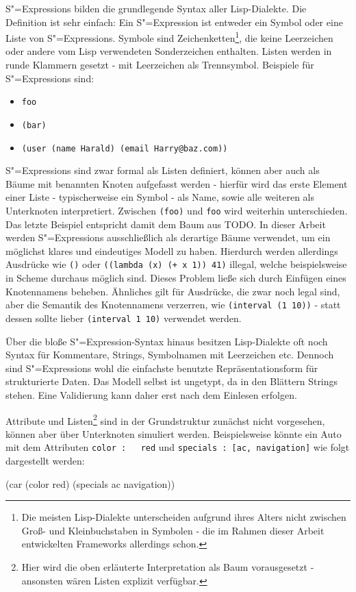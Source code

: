 \documentclass[a4paper, bibgerm]{book}
\newcommand\icode[1]{\lstinline?#1?}
\newcommand\abb{}
\newcommand{\sexp}{S"=Expression}
\newcommand{\sexps}{S"=Expressions}
\begin{document}
\sexps{} bilden die grundlegende Syntax aller Lisp-Dialekte. Die
Definition ist sehr einfach: Ein \sexp{} ist entweder ein Symbol oder
eine Liste von \sexps{}. Symbole sind Zeichenketten\footnote{Die meisten
Lisp-Dialekte unterscheiden aufgrund ihres Alters nicht zwischen Groß-
und Kleinbuchstaben in Symbolen - die im Rahmen dieser Arbeit
entwickelten Frameworks allerdings schon.}, die keine
Leerzeichen oder andere vom Lisp verwendeten Sonderzeichen
enthalten. Listen werden in runde Klammern gesetzt - mit Leerzeichen als
Trennsymbol. Beispiele für \sexps{} sind:
\begin{itemize}
\item \icode{foo}
\item \icode{(bar)}
\item \icode{(user (name Harald) (email Harry@baz.com))}
\end{itemize}

\sexps{} sind zwar formal als Listen definiert, können aber auch als
Bäume mit benannten Knoten aufgefasst werden - hierfür wird das erste
Element einer Liste - typischerweise ein Symbol - als Name, sowie alle
weiteren als Unterknoten interpretiert. Zwischen \icode{(foo)} und
\icode{foo} wird weiterhin unterschieden. Das letzte Beispiel entspricht
damit dem Baum aus \abb{TODO}. In dieser Arbeit werden \sexps{}
ausschließlich als derartige Bäume verwendet, um ein möglichst klares
und eindeutiges Modell zu haben. Hierdurch werden allerdings Ausdrücke
wie \icode{()} oder \icode{((lambda (x) (+ x 1)) 41)} illegal, welche
beispielsweise in Scheme\cite{TODO} durchaus möglich sind. Dieses
Problem ließe sich durch Einfügen eines Knotennamens beheben. Ähnliches
gilt für Ausdrücke, die zwar noch legal sind, aber die Semantik des
Knotennamens verzerren, wie \icode{(interval (1 10))} - statt dessen
sollte lieber \icode{(interval 1 10)} verwendet werden.

Über die bloße \sexp{}-Syntax hinaus besitzen Lisp-Dialekte oft noch
Syntax für Kommentare, Strings, Symbolnamen mit Leerzeichen
etc. Dennoch sind \sexps{} wohl die einfachste benutzte
Repräsentationsform für strukturierte Daten. Das Modell selbst ist
ungetypt, da in den Blättern Strings stehen. Eine Validierung kann
daher erst nach dem Einlesen erfolgen.

Attribute und Listen\footnote{Hier wird die oben erläuterte
  Interpretation als Baum vorausgesetzt - ansonsten wären Listen
  explizit verfügbar.} sind in der Grundstruktur zunächst nicht
vorgesehen, können aber über Unterknoten simuliert
werden. Beispielsweise könnte ein Auto mit dem Attributen \icode{color :
  red} und \icode{specials : [ac, navigation]} wie folgt dargestellt
werden:
\begin{code}
(car
  (color red)
  (specials ac navigation))
\end{code}
\end{document}
